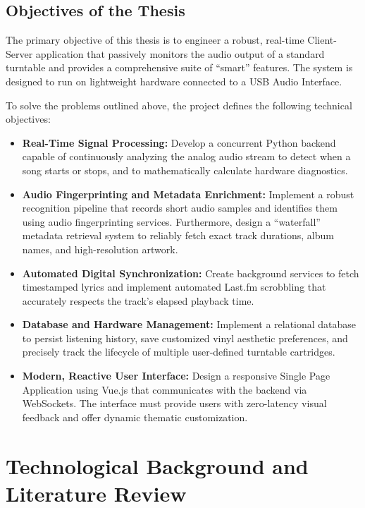 \documentclass[12pt,a4paper,english]{report}
\begin{document}
\section{Objectives of the Thesis}

The primary objective of this thesis is to engineer a robust, real-time Client-Server application that passively monitors the audio output of a standard turntable and provides a comprehensive suite of ``smart'' features. The system is designed to run on lightweight hardware connected to a USB Audio Interface.

To solve the problems outlined above, the project defines the following technical objectives:

\begin{itemize}
    \item \textbf{Real-Time Signal Processing:} Develop a concurrent Python backend capable of continuously analyzing the analog audio stream to detect when a song starts or stops, and to mathematically calculate hardware diagnostics.
    \item \textbf{Audio Fingerprinting and Metadata Enrichment:} Implement a robust recognition pipeline that records short audio samples and identifies them using audio fingerprinting services. Furthermore, design a ``waterfall'' metadata retrieval system to reliably fetch exact track durations, album names, and high-resolution artwork.
    \item \textbf{Automated Digital Synchronization:} Create background services to fetch timestamped lyrics and implement automated Last.fm scrobbling that accurately respects the track's elapsed playback time.
    \item \textbf{Database and Hardware Management:} Implement a relational database to persist listening history, save customized vinyl aesthetic preferences, and precisely track the lifecycle of multiple user-defined turntable cartridges.
    \item \textbf{Modern, Reactive User Interface:} Design a responsive Single Page Application using Vue.js that communicates with the backend via WebSockets. The interface must provide users with zero-latency visual feedback and offer dynamic thematic customization.
\end{itemize}

\chapter{Technological Background and Literature Review}
\end{document}
